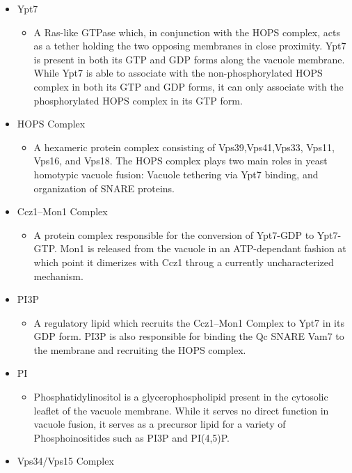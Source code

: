 \documentclass[12pt,twoside]{reedthesis}
\providecommand{\tightlist}{%
  \setlength{\itemsep}{0pt}\setlength{\parskip}{0pt}}
\begin{document}
\begin{itemize}
\tightlist
\item
  Ypt7

  \begin{itemize}
  \tightlist
  \item
    A Ras-like GTPase which, in conjunction with the HOPS complex, acts as a tether holding the two opposing membranes in close proximity. Ypt7 is present in both its GTP and GDP forms along the vacuole membrane. While Ypt7 is able to associate with the non-phosphorylated HOPS complex in both its GTP and GDP forms, it can only associate with the phosphorylated HOPS complex in its GTP form.
  \end{itemize}
\item
  HOPS Complex

  \begin{itemize}
  \tightlist
  \item
    A hexameric protein complex consisting of Vps39,Vps41,Vps33, Vps11, Vps16, and Vps18. The HOPS complex plays two main roles in yeast homotypic vacuole fusion: Vacuole tethering via Ypt7 binding, and organization of SNARE proteins.
  \end{itemize}
\item
  Ccz1--Mon1 Complex

  \begin{itemize}
  \tightlist
  \item
    A protein complex responsible for the conversion of Ypt7-GDP to Ypt7-GTP. Mon1 is released from the vacuole in an ATP-dependant fashion at which point it dimerizes with Ccz1 throug a currently uncharacterized mechanism.
  \end{itemize}
\item
  PI3P

  \begin{itemize}
  \tightlist
  \item
    A regulatory lipid which recruits the Ccz1--Mon1 Complex to Ypt7 in its GDP form. PI3P is also responsible for binding the Qc SNARE Vam7 to the membrane and recruiting the HOPS complex.
  \end{itemize}
\item
  PI

  \begin{itemize}
  \tightlist
  \item
    Phosphatidylinositol is a glycerophospholipid present in the cytosolic leaflet of the vacuole membrane. While it serves no direct function in vacuole fusion, it serves as a precursor lipid for a variety of Phosphoinositides such as PI3P and PI(4,5)P.
  \end{itemize}
\item
  Vps34/Vps15 Complex


\end{itemize}
\end{document}
